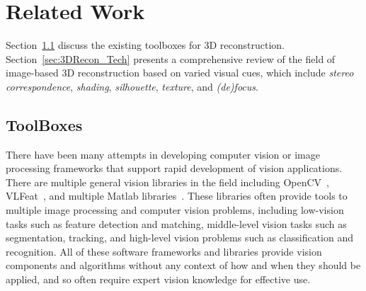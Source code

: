
\chapter{Related Work}
\label{ch:RelatedWork}
Section~\ref{sec:Toolbox} discuss the existing toolboxes for 3D reconstruction. Section~\ref{sec:3DRecon_Tech} presents a comprehensive review of the field of image-based 3D reconstruction based on varied visual cues, which include \textit{stereo correspondence}, \textit{shading}, \textit{silhouette}, \textit{texture}, and \textit{(de)focus}.

\section{ToolBoxes}
\label{sec:Toolbox}
There have been many attempts in developing computer vision or image processing frameworks that support rapid development of vision applications. There are multiple general vision libraries in the field including OpenCV~\cite{bradski2008learning}, VLFeat~\cite{vedaldi08vlfeat}, and multiple Matlab libraries~\cite{KovesiMATLABCode, MariottiniPr_RAM05}. These libraries often provide tools to multiple image processing and computer vision problems, including low-vision tasks such as feature detection and matching, middle-level vision tasks such as segmentation, tracking, and high-level vision problems such as classification and recognition. All of these software frameworks and libraries provide vision components and algorithms without any context of how and when they should be applied, and so often require expert vision knowledge for effective use.


